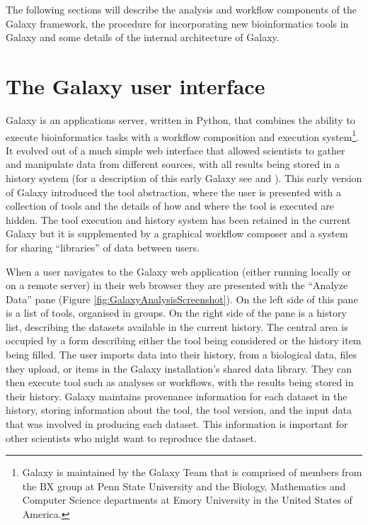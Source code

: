 \documentclass[a4paper,10pt]{scrreprt} \usepackage[utf8]{inputenc}
\begin{document}
The following sections will describe the analysis and workflow components of the Galaxy framework, the procedure for incorporating new bioinformatics tools in Galaxy and some details of the internal architecture of Galaxy.

\section{The Galaxy user interface}

Galaxy is an applications server, written in Python, that combines the ability to execute bioinformatics tasks with a workflow composition and execution system\footnote{Galaxy is maintained by the Galaxy Team that is comprised of members from the BX group at Penn State University and the Biology, Mathematics and Computer Science departments at Emory University in the United States of America.}. It evolved out of a much simple web interface that allowed scientists to gather and manipulate data from different sources, with all results being stored in a history system (for a description of this early Galaxy see \cite{giardine_galaxy:_2005} and \cite{nekrutenko_introduction_2011}). This early version of Galaxy introduced the tool abstraction, where the user is presented with a collection of tools and the details of how and where the tool is executed are hidden. The tool execution and history system has been retained in the current Galaxy but it is supplemented by a graphical workflow composer and a system for 
sharing ``libraries'' of data between users.

When a user navigates to the Galaxy web application (either running locally or on a remote server) in their web browser they are presented with the ``Analyze Data'' pane (Figure \ref{fig:GalaxyAnalysisScreenshot}). On the left side of this pane is a list of tools, organised in groups. On the right side of the pane is a history list, describing the datasets available in the current history. The central area is occupied by a form describing either the tool being considered or the history item being filled. The user imports data into their history, from a biological data, files they upload, or items in the Galaxy installation's shared data library. They can then execute tool such as analyses or workflows, with the results being stored in their history. Galaxy maintains provenance information for each dataset in the history, storing information about the tool, the tool version, and the input data that was involved in producing each dataset. This information is important for other scientists who might want to 
reproduce the dataset.
\end{document}
